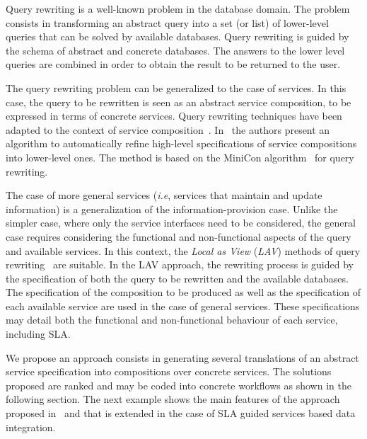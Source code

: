 Query rewriting is a well-known problem in the database domain.
The problem consists in transforming an abstract query into a set (or list) of lower-level queries that can be solved by  available databases.
Query rewriting is guided by the schema of  abstract and concrete databases.
The answers to the lower level queries are combined in order to obtain the result to be returned to the user.

The query rewriting problem can be generalized to the case of services.
In this case, the query to be rewritten is seen as an abstract service composition, to be expressed in terms of concrete services.
Query rewriting techniques have been adapted to the context of service composition~\cite{BBM10,ZLC11,CostaAMR13}. 
In~\cite{CostaAMR13} the authors present an algorithm to automatically refine high-level specifications of service compositions into lower-level ones. 
The method is based on the MiniCon algorithm~\cite{PH01} for query rewriting.

The case of more general services (\textit{i.e}, services that maintain and update information) is a generalization of the information-provision case.
Unlike the simpler case, where only the service interfaces need to be considered, the general case requires considering the functional and non-functional aspects of the query and available services.
In this context, the \textit{Local as View} (\textit{LAV}) methods of query rewriting~\cite{Levy2000} are suitable.
In the LAV approach, the rewriting process is guided by the specification of both the query to be rewritten and the available databases.
The specification of the composition to be produced as well as the specification of each available service are used in the case of general services.
These specifications may detail both the functional and non-functional behaviour of each service, including SLA.


We propose an approach consists in generating several translations of an abstract service specification into compositions
over concrete  services. 
The solutions proposed are ranked and may be coded into concrete workflows as shown in the following section.  The next example shows the main features of the approach proposed in~\cite{CostaAMR13} and that is extended in the case of SLA guided services based data integration. 

